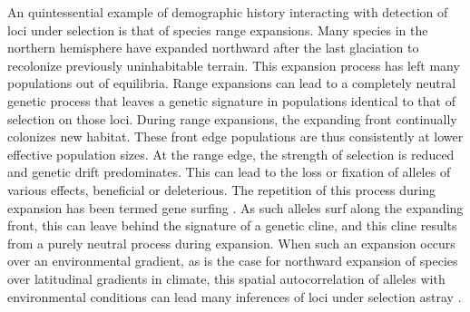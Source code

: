 An quintessential example of demographic history interacting with detection of loci under selection is that of species range expansions. Many species in the northern hemisphere have expanded northward after the last glaciation to recolonize previously uninhabitable terrain. This expansion process has left many populations out of equilibria. Range expansions can lead to a completely neutral genetic process that leaves a genetic signature in populations identical to that of selection on those loci. During range expansions, the expanding front continually colonizes new habitat. These front edge populations are thus consistently at lower effective population sizes. At the range edge, the strength of selection is reduced and genetic drift predominates. This can lead to the loss or fixation of alleles of various effects, beneficial or deleterious.  The repetition of this process during expansion has been termed gene surfing \citep{Klopfstein:2006}. As such alleles surf along the expanding front, this can leave behind the signature of a genetic cline, and this cline results from a purely neutral process during expansion. When such an expansion occurs over an environmental gradient, as is the case for northward expansion of species over latitudinal gradients in climate, this spatial autocorrelation of alleles with environmental conditions can lead many inferences of loci under selection astray \citep{Whitlock:2015}.

